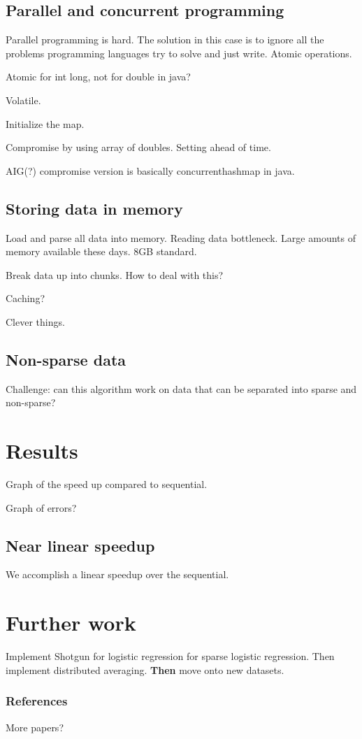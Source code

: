 \documentclass{article} %
\begin{document}
\subsection{Parallel and concurrent programming}
Parallel programming is hard. The solution in this case is to ignore all the problems programming languages try to solve and just write. Atomic operations.

Atomic for int long, not for double in java?

Volatile.

Initialize the map.

Compromise by using array of doubles. Setting ahead of time.

AIG(?) compromise version is basically concurrenthashmap in java.



\subsection{Storing data in memory}
Load and parse all data into memory. Reading data bottleneck. Large amounts of memory available these days. 8GB standard.

Break data up into chunks. How to deal with this?

Caching?

Clever things.

\subsection{Non-sparse data}
Challenge: can this algorithm work on data that can be separated into sparse and non-sparse?

\section{Results}
\label{headings}
Graph of the speed up compared to sequential.

Graph of errors?

\subsection{Near linear speedup}
We accomplish a linear speedup over the sequential.

\section{Further work}
Implement Shotgun for logistic regression for sparse logistic regression. Then implement distributed averaging. {\bf Then} move onto new datasets.


\subsubsection*{References}
More papers?
\cite{niu2011hogwild}
\cite{bradley2011parallel}
\cite{zhang2012comunication}

\begingroup
\renewcommand{\section}[2]{}%

	
\endgroup
\end{document}
